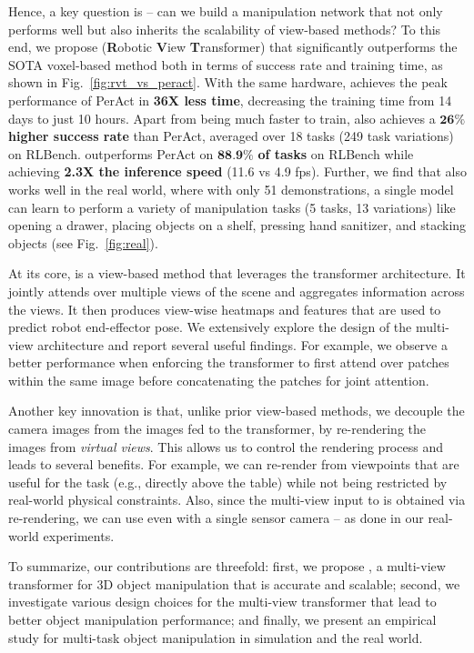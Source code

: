 Hence, a key question is -- can we build a manipulation network that not only performs well but also inherits the scalability of view-based methods? To this end, we propose \method (\textbf{R}obotic \textbf{V}iew \textbf{T}ransformer) that significantly outperforms the SOTA voxel-based method both in terms of success rate and training time, as shown in Fig.~\ref{fig:rvt_vs_peract}. With the same hardware, \method achieves the peak performance of PerAct in \textbf{36X less time}, decreasing the training time from 14 days to just 10 hours. Apart from being much faster to train, \method also achieves a $\textbf{26\%}$ \textbf{higher success rate} than PerAct, averaged over 18 tasks (249 task variations) on RLBench. \method outperforms PerAct on $\textbf{88.9\%}$ \textbf{of tasks} on RLBench while achieving \textbf{2.3X the inference speed} (11.6 vs 4.9 fps). Further, we find that \method also works well in the real world, where with only 51 demonstrations, a single \method model can learn to perform a variety of manipulation tasks (5 tasks, 13 variations) like opening a drawer, placing objects on a shelf, pressing hand sanitizer, and stacking objects (see Fig.~\ref{fig:real}).

At its core, \method is a view-based method that leverages the transformer architecture. It jointly attends over multiple views of the scene and aggregates information across the views. It then produces view-wise heatmaps and features that are used to predict robot end-effector pose. We extensively explore the design of the multi-view architecture and report several useful findings. For example, we observe a better performance when enforcing the transformer to first attend over patches within the same image before concatenating the patches for joint attention. 

Another key innovation is that, unlike prior view-based methods, we decouple the camera images from the images fed to the transformer, by re-rendering the images from \textit{virtual views}. This allows us to control the rendering process and leads to several benefits. For example, we can re-render from viewpoints that are useful for the task (e.g., directly above the table) while not being restricted by real-world physical constraints. Also, since the multi-view input to \method is obtained via re-rendering, we can use \method even with a single sensor camera -- as done in our real-world experiments.

To summarize, our contributions are threefold: first, we propose \method, a multi-view transformer for 3D object manipulation that is accurate and scalable; second, we investigate various design choices for the multi-view transformer that lead to better object manipulation performance; and finally, we present an empirical study for multi-task object manipulation in simulation and the real world.